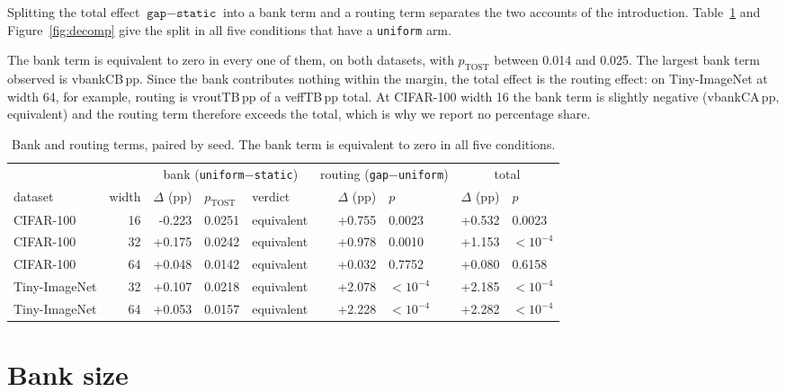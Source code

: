 \documentclass[10pt,a4paper]{article}
\newcommand{\V}[1]{\csname v#1\endcsname}
\begin{document}
Splitting the total effect $\texttt{gap}-\texttt{static}$ into a bank
term and a routing term separates the two accounts of the introduction.
Table~\ref{tab:decomp} and Figure~\ref{fig:decomp} give the split in all
five conditions that have a \texttt{uniform} arm.

The bank term is equivalent to zero in every one of them, on both
datasets, with $p_{\text{TOST}}$ between 0.014 and 0.025. The largest
bank term observed is \V{bankCB}\,pp. Since the bank contributes nothing
within the margin, the total effect is the routing effect: on
Tiny-ImageNet at width 64, for example, routing is \V{routTB}\,pp of a
\V{effTB}\,pp total. At CIFAR-100 width 16 the bank term is slightly
negative (\V{bankCA}\,pp, equivalent) and the routing term therefore
exceeds the total, which is why we report no percentage share.

\begin{table}[t]\centering\small
\caption{Bank and routing terms, paired by seed. The bank term is
equivalent to zero in all five conditions.}
\label{tab:decomp}
\begin{tabular}{l r rll rl rl}
\toprule
& & \multicolumn{3}{c}{bank (\texttt{uniform}$-$\texttt{static})}
& \multicolumn{2}{c}{routing (\texttt{gap}$-$\texttt{uniform})}
& \multicolumn{2}{c}{total} \\
\cmidrule(lr){3-5}\cmidrule(lr){6-7}\cmidrule(lr){8-9}
dataset & width & $\Delta$ (pp) & $p_{\text{TOST}}$ & verdict & $\Delta$ (pp) & $p$ & $\Delta$ (pp) & $p$ \\
\midrule
CIFAR-100 & 16 & -0.223 & 0.0251 & equivalent & +0.755 & 0.0023 & +0.532 & 0.0023 \\
CIFAR-100 & 32 & +0.175 & 0.0242 & equivalent & +0.978 & 0.0010 & +1.153 & $<10^{-4}$ \\
CIFAR-100 & 64 & +0.048 & 0.0142 & equivalent & +0.032 & 0.7752 & +0.080 & 0.6158 \\
Tiny-ImageNet & 32 & +0.107 & 0.0218 & equivalent & +2.078 & $<10^{-4}$ & +2.185 & $<10^{-4}$ \\
Tiny-ImageNet & 64 & +0.053 & 0.0157 & equivalent & +2.228 & $<10^{-4}$ & +2.282 & $<10^{-4}$ \\
\bottomrule
\end{tabular}
\end{table}

\section{Bank size}\label{sec:ksweep}
\end{document}
